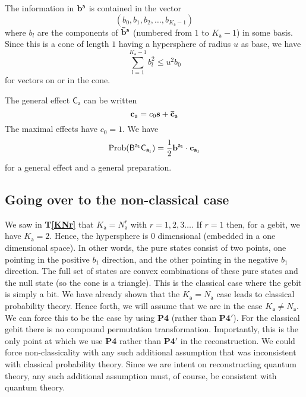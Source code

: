 \documentclass[10pt]{article}
\begin{document}
The information in ${\bf b}^\mathsf{a}$ is contained in the vector
\begin{equation}
( b_0,   b_1,  b_2, \dots, b_{K_\mathsf{a}-1})
\end{equation}
where $b_l$ are the components of ${\bf \bar b}^\mathsf{a}$ (numbered from $1$ to $K_\mathsf{a}-1$) in some basis.  Since this is a cone of length $1$ having a hypersphere of radius $u$ as base, we have
\begin{equation}\label{hyperconeconstraint}
\sum_{l=1}^{K_\mathsf{a}-1} b_l^2 \leq u^2 b_0
\end{equation}
for vectors on or in the cone.

The general effect $\mathsf{C_{a}}$ can be written
\begin{equation}
{\bf c}_\mathsf{a} = c_0 {\bf s} + {\bf \bar c}_\mathsf{a}
\end{equation}
The maximal effects have $c_0=1$.  We have
\begin{equation}
\text{Prob}(\mathsf{B^{a_1}C_{a_1}}) = \frac{1}{2}{\bf b}^\mathsf{a_1} \cdot {\bf c}_\mathsf{a_1}
\end{equation}
for a general effect and a general preparation.


\subsection{Going over to the non-classical case}\label{nonclassicalsection}

We saw in {\bf T\ref{KNr}} that $K_\mathsf{a}=N_\mathsf{a}^r$ with $r=1, 2, 3\dots $.  If $r=1$ then, for a gebit, we have $K_\mathsf{a}=2$.  Hence, the hypersphere is 0 dimensional (embedded in a one dimensional space). In other words, the pure states consist of two points, one pointing in the positive $b_1$ direction, and the other pointing in the negative $b_1$ direction.  The full set of states are convex combinations of these pure states and the null state (so the cone is a triangle).  This is the classical case where the gebit is simply a bit.  We have already shown that the $K_\mathsf{a}=N_\mathsf{a}$ case leads to classical probability theory.  Hence forth, we will assume that we are in the case $K_\mathsf{a}\not=N_\mathsf{a}$.   We can force this to be the case by using {\bf P4} (rather than {\bf P4}$'$).  For the classical gebit there is no compound permutation transformation.  Importantly, this is the only point at which we use {\bf P4} rather than {\bf P4}$'$ in the reconstruction.  We could force non-classicality with any such additional assumption that was inconsistent with classical probability theory.  Since we are intent on reconstructing quantum theory, any such additional assumption must, of course, be consistent with quantum theory.
\end{document}

